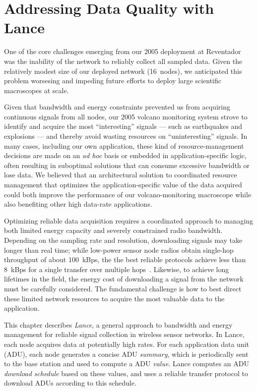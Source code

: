 \chapter{Addressing Data Quality with Lance}
\label{lance-chapter-lance}

One of the core challenges emerging from our 2005 deployment at Reventador
was the inability of the network to reliably collect all sampled data. Given
the relatively modest size of our deployed network (16~nodes), we anticipated
this problem worsesing and impeding future efforts to deploy large scientific
macroscopes at scale.

Given that bandwidth and energy constraints prevented us from acquiring
continuous signals from all nodes, our 2005 volcano monitoring system strove
to identify and acquire the most ``interesting'' signals --- such as
earthquakes and explosions --- and thereby avoid wasting resources on
``uninteresting'' signals. In many cases, including our own application,
these kind of resource-management decisions are made on an \textit{ad hoc} basis
or embedded in application-specific logic, often resulting in suboptimal
solutions that can consume excessive bandwidth or lose data. We believed
that an architectural solution to coordinated resource management that
optimizes the application-specific value of the data acquired could both
improve the performance of our volcano-monitoring macroscope while also
benefiting other high data-rate applications.

Optimizing reliable data acquisition requires a coordinated approach to
managing both limited energy capacity and severely constrained radio
bandwidth. Depending on the sampling rate and resolution, downloading signals
may take longer than real time; while low-power sensor node radios obtain
single-hop throughput of about 100~kBps, the the best reliable protocols
achieve less than 8~kBps for a single transfer over multiple
hops~\cite{flush-sensys07}. Likewise, to achieve long lifetimes in the field,
the energy cost of downloading a signal from the network must be carefully
considered. The fundamental challenge is how to best direct these limited
network resources to acquire the most valuable data to the application.

This chapter describes \textit{Lance}, a general approach to bandwidth and
energy management for reliable signal collection in wireless sensor networks.
In Lance, each node acquires data at potentially high rates. For each
application data unit (ADU), each node generates a concise ADU
\textit{summary}, which is periodically sent to the base station and used to
compute a ADU \textit{value}. Lance computes an ADU \textit{download
schedule} based on these values, and uses a reliable transfer protocol to
download ADUs according to this schedule.

